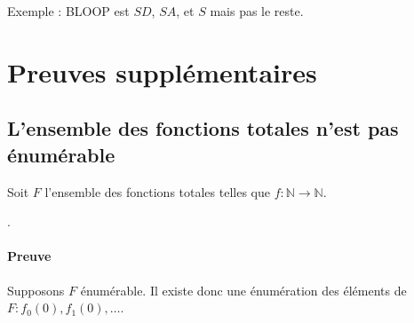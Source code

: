 Exemple : BLOOP est $SD$, $SA$, et $S$ mais pas le reste.

\chapter{Preuves supplémentaires}

\section{L'ensemble des fonctions totales n'est pas énumérable}\label{sec:ensembleF}

Soit $F$ l'ensemble des fonctions totales telles que $f : \mathbb{N} \rightarrow \mathbb{N}$.

.

\subsubsection*{Preuve}

Supposons $F$ énumérable. Il existe donc une énumération des éléments de $F : f_0(0), f_1(0), \ldots$.

